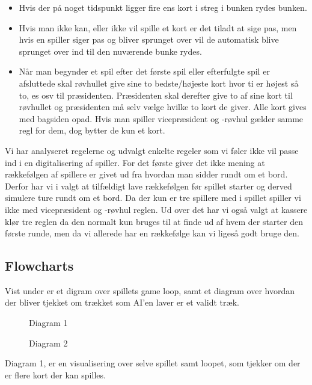 \documentclass[a4paper, 12pt]{article}
\begin{document}
\begin{itemize}
	\item Hvis der på noget tidspunkt ligger fire ens kort i streg i bunken rydes bunken.
	\item Hvis man ikke kan, eller ikke vil spille et kort er det tiladt at sige pas, men hvis en spiller siger pas og bliver sprunget over vil de automatisk blive sprunget over ind til den nuværende bunke rydes.
	\item Når man begynder et spil efter det første spil eller efterfulgte spil er afsluttede skal røvhullet give sine to bedste/højeste kort hvor ti er højest så to, es osv til præsidenten. Præsidenten skal derefter give to af sine kort til røvhullet og præsidenten må selv vælge hvilke to kort de giver. Alle kort gives med bagsiden opad. Hvis man spiller vicepræsident og -røvhul gælder samme regl for dem, dog bytter de kun et kort. 
\end{itemize}

Vi har analyseret regelerne og udvalgt enkelte regeler som vi føler ikke vil passe ind i en digitalisering af spiller. For det første giver det ikke mening at rækkefølgen af spillere er givet ud fra hvordan man sidder rundt om et bord. Derfor har vi i valgt at tilfældigt lave rækkefølgen før spillet starter og derved simulere ture rundt om et bord. Da der kun er tre spillere med i spillet spiller vi ikke med vicepræsident og -røvhul reglen.
Ud over det har vi også valgt at kassere klør tre reglen da den normalt kun bruges til at finde ud af hvem der starter den første runde, men da vi allerede har en rækkefølge kan vi ligeså godt bruge den.

\vfill
\pagebreak

\subsection{Flowcharts}
Vist under er et digram over spillets game loop, samt et diagram over hvordan der bliver tjekket om trækket som AI'en laver er et validt træk.
\begin{figure}[H]
	\centering
	\resizebox{.5\linewidth}{!}{}
	\caption{Diagram 1}
\end{figure}

\begin{figure}[H]
	\centering
	\resizebox{.5\linewidth}{!}{}
	\caption{Diagram 2}
\end{figure}

Diagram 1, er en visualisering over selve spillet samt loopet, som tjekker om der er flere kort der kan spilles.
\bigbreak
\end{document}
